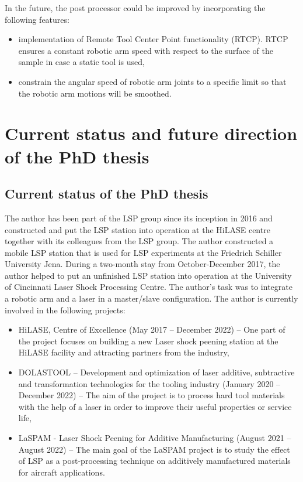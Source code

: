In the future, the post processor could be improved by incorporating the following features:

\begin{itemize}

    \item implementation of Remote Tool Center Point functionality (RTCP). RTCP ensures a constant robotic arm speed with respect to the surface of the sample in case a static tool is used,

    \item constrain the angular speed of robotic arm joints to a specific limit so that the robotic arm motions will be smoothed.

\end{itemize}
\section{Current status and future direction of the PhD thesis}

\subsection{Current status of the PhD thesis}

The author has been part of the LSP group since its inception in 2016 and constructed and put the LSP station into operation at the HiLASE centre together with its colleagues from the LSP group. The author constructed a mobile LSP station that is used for LSP experiments at the Friedrich Schiller University Jena. During a two-month stay from October-December 2017, the author helped to put an unfinished LSP station into operation at the University of Cincinnati Laser Shock Processing Centre. The author's task was to integrate a robotic arm and a laser in a master/slave configuration. The author is currently involved in the following projects:

\begin{itemize}

    \item HiLASE, Centre of Excellence (May 2017 -- December 2022) -- One part of the project focuses on building a new Laser shock peening station at the HiLASE facility and attracting partners from the industry,

    \item DOLASTOOL -- Development and optimization of laser additive, subtractive and transformation technologies for the tooling industry (January 2020 -- December 2022) -- The aim of the project is to process hard tool materials with the help of a laser in order to improve their useful properties or service life, 

    \item LaSPAM - Laser Shock Peening for Additive Manufacturing (August 2021 -- August 2022) -- The main goal of the LaSPAM project is to study the effect of LSP as a post-processing technique on additively manufactured materials for aircraft applications.
    
\end{itemize}
    
